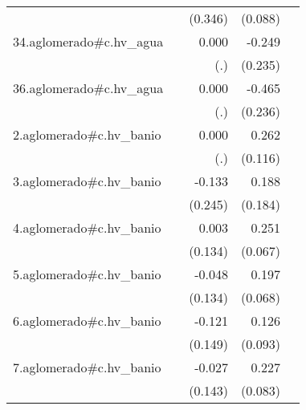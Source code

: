 {\begin{longtable}{l*{4}{D{.}{.}{-1}}}
            &                     &     (0.346)         &     (0.088)         &                     \\
\addlinespace
34.aglomerado#c.hv\_agua&                     &       0.000         &      -0.249         &                     \\
            &                     &         (.)         &     (0.235)         &                     \\
\addlinespace
36.aglomerado#c.hv\_agua&                     &       0.000         &      -0.465\sym{*}  &                     \\
            &                     &         (.)         &     (0.236)         &                     \\
\addlinespace
2.aglomerado#c.hv\_banio&                     &       0.000         &       0.262\sym{*}  &                     \\
            &                     &         (.)         &     (0.116)         &                     \\
\addlinespace
3.aglomerado#c.hv\_banio&                     &      -0.133         &       0.188         &                     \\
            &                     &     (0.245)         &     (0.184)         &                     \\
\addlinespace
4.aglomerado#c.hv\_banio&                     &       0.003         &       0.251\sym{***}&                     \\
            &                     &     (0.134)         &     (0.067)         &                     \\
\addlinespace
5.aglomerado#c.hv\_banio&                     &      -0.048         &       0.197\sym{**} &                     \\
            &                     &     (0.134)         &     (0.068)         &                     \\
\addlinespace
6.aglomerado#c.hv\_banio&                     &      -0.121         &       0.126         &                     \\
            &                     &     (0.149)         &     (0.093)         &                     \\
\addlinespace
7.aglomerado#c.hv\_banio&                     &      -0.027         &       0.227\sym{**} &                     \\
            &                     &     (0.143)         &     (0.083)         &                     \\

\end{longtable}}
